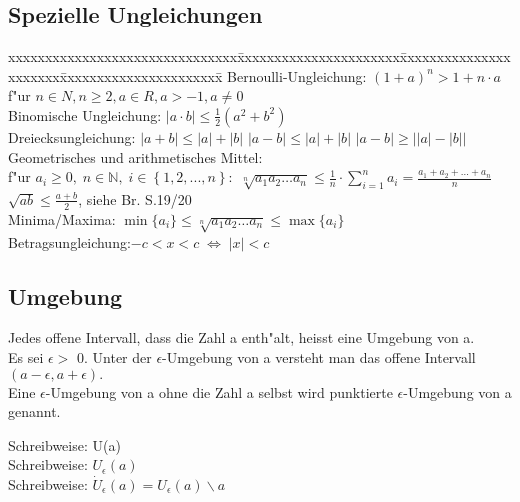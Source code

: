 \subsection{Spezielle Ungleichungen}
	\begin{tabbing}	xxxxxxxxxxxxxxxxxxxxxxxxxxxxxxx\=xxxxxxxxxxxxxxxxxxxxxx\=xxxxxxxxxxxxxxxxxxxxxx\=xxxxxxxxxxxxxxxxxxxxxx\=\kill
		Bernoulli-Ungleichung: \>
			$(1 + a)^n > 1 + n \cdot a$\>
				f"ur $n \in N, n \geq 2, a \in R, a > -1, a\neq0$\\
		Binomische Ungleichung: \>
			$|a\cdot b|\leq\frac{1}{2}(a^2 + b^2)$\\
		Dreiecksungleichung: \>
			$\left|a+b\right|\leq\left|a\right|+\left|b\right|$ \>
				$\left|a-b\right|\leq\left|a\right|+\left|b\right|$ \>
					$\left|a-b\right|\geq\left|\left|a\right|-\left|b\right|\right|$\\
		Geometrisches und arithmetisches Mittel:\\ 
		f"ur $a_i\geq0,\;n \in \mathbb{N},\;i \in \left\{1,2,...,n \right\}:$\>
			$\sqrt[n]{a_1 a_2 \ldots a_n}\leq \frac{1}{n} \cdot \sum\limits _{i=1}^n a_i = 	\frac{a_1+a_2+...+a_n}{n}$\>\>
			$\sqrt{ab}\leq \frac{a+b}{2}$, siehe Br. S.19/20 \\
		Minima/Maxima: \>
			$\min\{a_i\} \leq \sqrt[n]{a_1a_2 \ldots a_n} \leq \max\{a_i\}$\\
		Betragsungleichung:\>$-c<x<c\;\Leftrightarrow\;|x|<c$
	\end{tabbing}

\subsection{Umgebung}
	\begin{minipage}[c]{14.5cm}
		Jedes offene Intervall, dass die Zahl a enth"alt, heisst eine Umgebung von a. \\
		Es sei $\epsilon >$ 0. Unter der $\epsilon$-Umgebung von a versteht man das offene Intervall $(a-\epsilon,a+\epsilon).$\\
		Eine $\epsilon$-Umgebung von a ohne die Zahl a selbst wird punktierte $\epsilon$-Umgebung von a genannt.
	\end{minipage}
	\begin{minipage}[c]{5cm}
	Schreibweise: U(a)\\
	Schreibweise: $U_\epsilon(a)$\\
	Schreibweise: $\dot{U}_\epsilon(a)=U_\epsilon(a)\smallsetminus{a}$
	\end{minipage}

